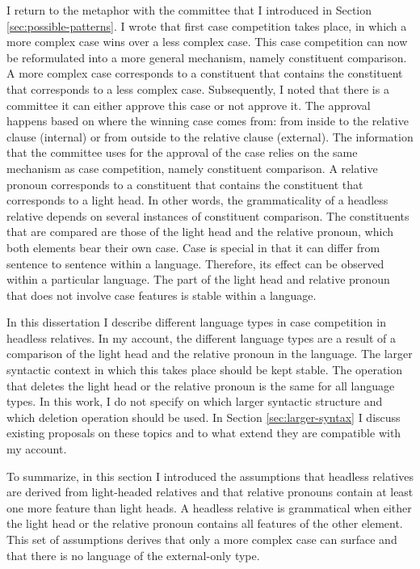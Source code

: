 I return to the metaphor with the committee that I introduced in Section \ref{sec:possible-patterns}. I wrote that first case competition takes place, in which a more complex case wins over a less complex case. This case competition can now be reformulated into a more general mechanism, namely constituent comparison. A more complex case corresponds to a constituent that contains the constituent that corresponds to a less complex case.
Subsequently, I noted that there is a committee it can either approve this case or not approve it. The approval happens based on where the winning case comes from: from inside to the relative clause (internal) or from outside to the relative clause (external). The information that the committee uses for the approval of the case relies on the same mechanism as case competition, namely constituent comparison. A relative pronoun corresponds to a constituent that contains the constituent that corresponds to a light head.
In other words, the grammaticality of a headless relative depends on several instances of constituent comparison. The constituents that are compared are those of the light head and the relative pronoun, which both elements bear their own case. Case is special in that it can differ from sentence to sentence within a language. Therefore, its effect can be observed within a particular language. The part of the light head and relative pronoun that does not involve case features is stable within a language.

In this dissertation I describe different language types in case competition in headless relatives. In my account, the different language types are a result of a comparison of the light head and the relative pronoun in the language.
The larger syntactic context in which this takes place should be kept stable. The operation that deletes the light head or the relative pronoun is the same for all language types. In this work, I do not specify on which larger syntactic structure and which deletion operation should be used. In Section \ref{sec:larger-syntax} I discuss existing proposals on these topics and to what extend they are compatible with my account.

To summarize, in this section I introduced the assumptions that headless relatives are derived from light-headed relatives and that relative pronouns contain at least one more feature than light heads. A headless relative is grammatical when either the light head or the relative pronoun contains all features of the other element. This set of assumptions derives that only a more complex case can surface and that there is no language of the external-only type.

